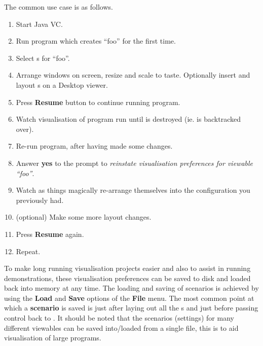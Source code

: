 The common use case is as follows.
\begin{enumerate}
\item Start Java VC.
\item Run program which creates \viewable{} ``foo'' for the first
time.
\item Select \viewer{}s for ``foo''.
\item Arrange \viewer{} windows on screen, resize and scale to taste.
Optionally insert and layout \viewlet{}s on a Desktop viewer.
\item Press \textbf{Resume} button to continue running program.
\item Watch visualisation of program run until \viewable{} is
destroyed (ie. is backtracked over).
\item Re-run program, after having made some changes.
\item Answer \textbf{yes} to the prompt to \emph{reinstate
visualisation preferences for viewable ``foo''}.
\item Watch as things magically re-arrange themselves into the configuration you previously had.
\item (optional) Make some more layout changes.
\item Press \textbf{Resume} again.
\item Repeat.
\end{enumerate}

To make long running visualisation projects easier and also to assist
in running demonstrations, these visualisation preferences can be
saved to disk and loaded back into memory at any time.  The loading
and saving of scenarios is achieved by using the \textbf{Load} and
\textbf{Save} options of the \textbf{File} menu.  The most common
point at which a \textbf{scenario} is saved is just after laying out
all the \viewer{}s and just before passing control back to {\eclipse}.
It should be noted that the scenarios (settings) for many different
viewables can be saved into/loaded from a single file, this is to aid
visualisation of large programs.
